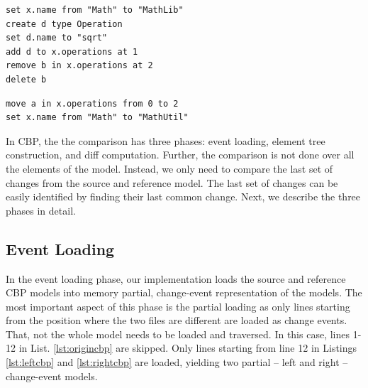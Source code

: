 \documentclass{jot}
\begin{document}
\begin{minipage}[t]{0.49\linewidth}    
\begin{lstlisting}[firstnumber=13,style=eol,caption={The appended changes made by Bob to produce the model in Fig. \ref{fig:left}  (left version).},label=lst:leftcbp]
set x.name from "Math" to "MathLib"
create d type Operation
set d.name to "sqrt"
add d to x.operations at 1
remove b in x.operations at 2
delete b
\end{lstlisting}
\end{minipage}
\hfill
\begin{minipage}[t]{0.49\linewidth}
\begin{lstlisting}[firstnumber=13,style=eol,caption={The appended changes made by Alice to produce the model in Fig. \ref{fig:right} (right version).},label=lst:rightcbp]
move a in x.operations from 0 to 2
set x.name from "Math" to "MathUtil"
\end{lstlisting}
\end{minipage}

In CBP, the the comparison has three phases: event loading, element tree construction, and diff computation.
Further, the comparison is not done over all the elements of the model.
Instead, we only need to compare the last set of changes from the source and reference model.
The last set of changes can be easily identified by finding their last common change.
Next, we describe the three phases in detail.


\subsection{Event Loading}
\label{sec:event_loading}
In the event loading phase, our implementation loads the source and reference CBP models into memory partial, change-event representation of the models.
The most important aspect of this phase is the partial loading as only lines starting from the position where the two files are different are loaded as change events.
That, not the whole model needs to be loaded and traversed.
In this case, lines 1-12 in List. \ref{lst:origincbp} are skipped.
Only lines starting from line 12 in Listings \ref{lst:leftcbp} and \ref{lst:rightcbp} are loaded, yielding two partial -- left and right -- change-event models. 
\end{document}
